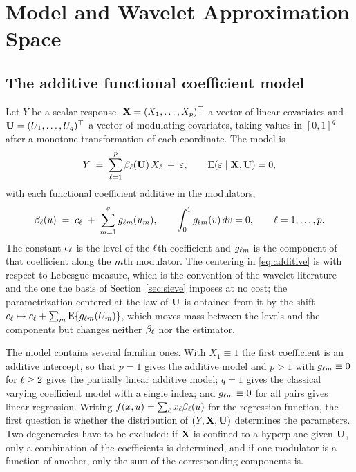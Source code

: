 \section{Model and Wavelet \texorpdfstring{Approximation Space}{Approximation Space}}
\label{sec:model}

\subsection{The additive functional coefficient model}
\label{sec:model-def}

Let $Y$ be a scalar response, $\mathbf{X} = (X_1,\dots,X_p)^{\top}$ a vector of linear
covariates and $\mathbf{U} = (U_1,\dots,U_q)^{\top}$ a vector of modulating covariates,
taking values in $[0,1]^q$ after a monotone transformation of each
coordinate. The model is
\begin{equation}
  \label{eq:model}
  Y \;=\; \sum_{\ell=1}^{p} \beta_{\ell}(\mathbf{U})\,X_{\ell} \;+\; \varepsilon,
  \qquad \mathrm{E}(\varepsilon \mid \mathbf{X}, \mathbf{U}) = 0,
\end{equation}
with each functional coefficient additive in the modulators,
\begin{equation}
  \label{eq:additive}
  \beta_{\ell}(u) \;=\; c_{\ell} \;+\; \sum_{m=1}^{q}g_{\ell m}(u_{m}),
  \qquad \int_{0}^{1}g_{\ell m}(v)\,dv = 0,
  \qquad \ell = 1,\dots,p .
\end{equation}
The constant $c_{\ell}$ is the level of the $\ell$th coefficient and
$g_{\ell m}$ is the component of that coefficient along the $m$th
modulator. The centering in \eqref{eq:additive} is with respect to Lebesgue
measure, which is the convention of the wavelet literature and the one the
basis of Section~\ref{sec:sieve} imposes at no cost; the parametrization
centered at the law of $\mathbf{U}$ is obtained from it by the shift
$c_{\ell} \mapsto c_{\ell} + \sum_{m}\mathrm{E}\{g_{\ell m}(U_{m})\}$,
which moves mass between the levels and the components but changes neither
$\beta_{\ell}$ nor the estimator.

The model contains several familiar ones. With $X_1 \equiv 1$ the first
coefficient is an additive intercept, so that $p = 1$ gives the additive model
and $p > 1$ with $g_{\ell m} \equiv 0$ for $\ell \ge 2$ gives the
partially linear additive model; $q = 1$ gives the classical varying
coefficient model with a single index; and $g_{\ell m}\equiv 0$ for all
pairs gives linear regression. Writing
$f(x,u) = \sum_{\ell} x_{\ell}\beta_{\ell}(u)$ for the regression function, the
first question is whether the distribution of $(Y,\mathbf{X},\mathbf{U})$ determines the
parameters. Two degeneracies have to be excluded: if $\mathbf{X}$ is confined to a
hyperplane given $\mathbf{U}$, only a combination of the coefficients is determined,
and if one modulator is a function of another, only the sum of the
corresponding components is.

